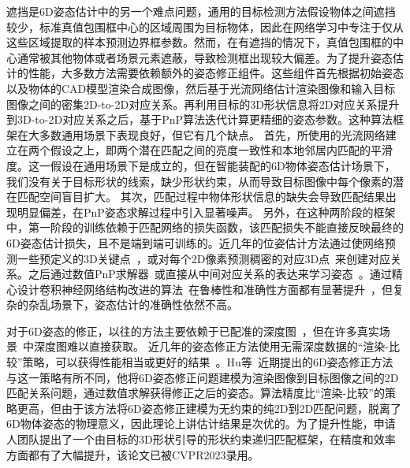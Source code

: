\documentclass[12pt]{article}
\begin{document}
遮挡是6D姿态估计中的另一个难点问题，通用的目标检测方法假设物体之间遮挡较少，标准真值包围框中心的区域周围为目标物体，因此在网络学习中专注于仅从这些区域提取的样本预测边界框参数。然而，在有遮挡的情况下，真值包围框的中心通常被其他物体或者场景元素遮蔽，导致检测框出现较大偏差。为了提升姿态估计的性能，大多数方法需要依赖额外的姿态修正组件。这些组件首先根据初始姿态以及物体的CAD模型渲染合成图像，然后基于光流网络估计渲染图像和输入目标图像之间的密集2D-to-2D对应关系。再利用目标的3D形状信息将2D对应关系提升到3D-to-2D对应关系之后，基于PnP算法迭代计算更精细的姿态参数。这种算法框架在大多数通用场景下表现良好，但它有几个缺点。
首先，所使用的光流网络建立在两个假设之上，即两个潜在匹配之间的亮度一致性和本地邻居内匹配的平滑度。这一假设在通用场景下是成立的，但在智能装配的6D物体姿态估计场景下，我们没有关于目标形状的线索，缺少形状约束，从而导致目标图像中每个像素的潜在匹配空间盲目扩大。
其次，匹配过程中物体形状信息的缺失会导致匹配结果出现明显偏差，在PnP姿态求解过程中引入显著噪声。
另外，在这种两阶段的框架中，第一阶段的训练依赖于匹配网络的损失函数，该匹配损失不能直接反映最终的6D姿态估计损失，且不是端到端可训练的。近几年的位姿估计方法通过使网络预测一些预定义的3D关键点~\cite{rad2017bb8, hu2019segDriven, peng2019pvnet, Hu2021}，或对每个2D像素预测稠密的对应3D点~\cite{zakharov2019dpod, Su2022, li2019cdpn, wang2021gdrnet, Di2021}来创建对应关系。之后通过数值PnP求解器~\cite{lepetit2009epnp}或直接从中间对应关系的表达来学习姿态~\cite{hu2020singleStage, EroPnP,wang2021gdrnet, Di2021}。通过精心设计卷积神经网络结构改进的算法~\cite{he2016resnet, resnext_2017_cvpr}在鲁棒性和准确性方面都有显著提升~\cite{Xiang2018, peng2019pvnet, wang2019densefusion60}，但复杂的杂乱场景下，姿态估计的准确性依然不高。

对于6D姿态的修正，以往的方法主要依赖于已配准的深度图~\cite{Xiang2018, li2019cdpn, wang2019densefusion60}，但在许多真实场景~\cite{Hu2021}中深度图难以直接获取。
近几年的姿态修正方法使用无需深度数据的“渲染-比较”策略，可以获得性能相当或更好的结果~\cite{li2018deepim, zakharov2019dpod, cosypose, rad2017bb8, Hu2022, Lipson2022, RNNPose_2022_cvpr,Repose_2021_iccv}。Hu等~\cite{Hu2022}近期提出的6D姿态修正方法与这一策略有所不同，他将6D姿态修正问题建模为渲染图像到目标图像之间的2D匹配关系问题，通过数值求解获得修正之后的姿态。算法精度比“渲染-比较”的策略更高，但由于该方法将6D姿态修正建模为无约束的纯2D到2D匹配问题，脱离了6D物体姿态的物理意义，因此理论上讲估计结果是次优的。为了提升性能，申请人团队提出了一个由目标的3D形状引导的形状约束递归匹配框架，在精度和效率方面都有了大幅提升，该论文已被CVPR2023录用。
\end{document}
